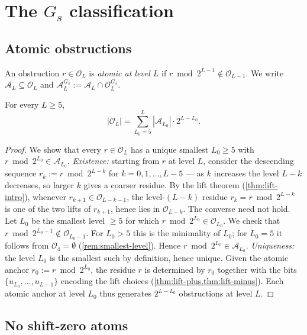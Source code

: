 \documentclass[11pt,reqno]{amsart}
\newcommand{\Obs}{\mathcal{O}}
\newcommand{\Atom}{\mathcal{A}}
\begin{document}
\section{The \texorpdfstring{$G_s$}{Gs} classification}
\label{sec:Gs}

\subsection{Atomic obstructions}

An obstruction $r \in \Obs_L$ is \emph{atomic at level $L$} if
$r \bmod 2^{L-1} \notin \Obs_{L-1}$. We write $\Atom_L \subseteq \Obs_L$ and
$\Atom_L^{G_s} := \Atom_L \cap \Obs_L^{G_s}$.

\begin{lemma}
\label{lem:atom-decomp}
For every $L \ge 5$,
\[
|\Obs_L| = \sum_{L_0 = 5}^{L} |\Atom_{L_0}| \cdot 2^{L - L_0}.
\]
\end{lemma}

\begin{proof}
We show that every $r \in \Obs_L$ has a unique smallest $L_0 \ge 5$ with
$r \bmod 2^{L_0} \in \Atom_{L_0}$. \emph{Existence:} starting from $r$ at
level $L$, consider the descending sequence $r_k := r \bmod 2^{L-k}$ for
$k = 0, 1, \ldots, L - 5$ --- as $k$ increases the level $L-k$ decreases, so
larger $k$ gives a coarser residue. By the lift theorem (\cref{thm:lift-intro}),
whenever $r_{k+1} \in \Obs_{L-k-1}$, the level-$(L-k)$ residue
$r_k = r \bmod 2^{L-k}$ is one of the two lifts of $r_{k+1}$, hence
lies in $\Obs_{L-k}$. The converse need not hold. Let
$L_0$ be the smallest level $\ge 5$ for which
$r \bmod 2^{L_0} \in \Obs_{L_0}$. We check that
$r \bmod 2^{L_0 - 1} \notin \Obs_{L_0 - 1}$. For $L_0 > 5$ this is the
minimality of $L_0$; for $L_0 = 5$ it follows from $\Obs_4 = \emptyset$
(\cref{rem:smallest-level}). Hence
$r \bmod 2^{L_0} \in \Atom_{L_0}$.
\emph{Uniqueness:} the level $L_0$ is the smallest such by definition, hence
unique. Given the atomic anchor $r_0 := r \bmod 2^{L_0}$, the residue $r$ is
determined by $r_0$ together with the bits $\{u_{L_0}, \ldots, u_{L-1}\}$
encoding the lift choices (\cref{thm:lift-plus,thm:lift-minus}).
Each atomic anchor at level $L_0$ thus generates $2^{L - L_0}$ obstructions
at level $L$. \qedhere
\end{proof}

\subsection{No shift-zero atoms}
\end{document}
